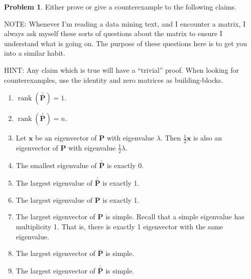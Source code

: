 \documentclass[10pt]{article}
\theoremstyle{definition}
\newtheorem{problem}{Problem}
\DeclareMathOperator{\rank}{rank}
\newcommand{\p}{\mathbf P}
\newcommand{\pb}{\bar {\p}}
\newcommand{\pbb}{\bar {\pb}}
\newcommand{\x}{\mathbf x}
\begin{document}
\newpage
\begin{problem}
    Either prove or give a counterexample to the following claims.

    NOTE:
    Whenever I'm reading a data mining text, and I encounter a matrix, I always ask myself these sorts of questions about the matrix to ensure I understand what is going on.
    The purpose of these questions here is to get you into a similar habit.

    HINT:
    Any claim which is true will have a ``trivial'' proof.
    When looking for counterexamples, use the identity and zero matrices as building-blocks.
    \begin{enumerate}
        \item
            $\rank(\pbb) = 1$.
            \vspace{4.5in}
        \item
            $\rank(\pbb) = n$.
            \vspace{4.5in}

        \item
            Let $\x$ be an eigenvector of $\p$ with eigenvalue $\lambda$.
            Then $\frac 1 2 \x$ is also an eigenvector of $\p$ with eigenvalue $\frac 1 2 \lambda$.
            \vspace{4.5in}

        \item
            The smallest eigenvalue of $\pbb$ is exactly 0.
            \vspace{4.5in}
        \item
            The largest eigenvalue of $\pbb$ is exactly 1.
            \vspace{4.5in}
        \item
            The largest eigenvalue of $\p$ is exactly 1.
            \vspace{4.5in}

        \item
            The largest eigenvector of $\p$ is simple.
            Recall that a simple eigenvalue has multiplicity 1.
            That is, there is exactly 1 eigenvector with the same eigenvalue.
            \vspace{4.5in}

        \item
            The largest eigenvector of $\pb$ is simple.
            \vspace{4.5in}

        \item
            The largest eigenvector of $\pbb$ is simple.
            \vspace{4.5in}


\end{enumerate}
\end{problem}
\end{document}
